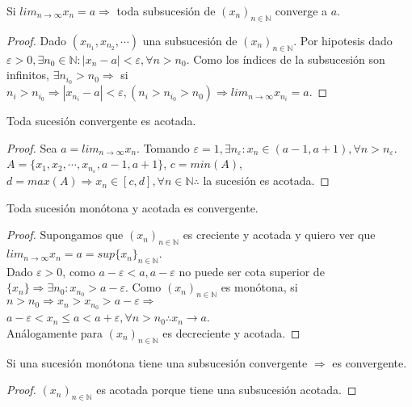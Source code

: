 \begin{theorem}
  Si $lim_{n \to \infty} x_n = a \Rightarrow$ toda subsucesión de $(x_n)_{n \in \mathbb{N}}$ converge a $a$.

  \begin{proof}
    Dado $(x_{n_1}, x_{n_2}, \cdots)$ una subsucesión de $(x_n)_{n \in \mathbb{N}}$. Por hipotesis dado $\varepsilon > 0, \exists n_0 \in \mathbb{N} : |x_n - a| < \varepsilon, \forall n > n_0$. Como los índices de la subsucesión son infinitos, $\exists n_{i_0} > n_0 \Rightarrow$ si $n_i > n_{i_0} \Rightarrow |x_{n_i} - a| < \varepsilon, (n_i > n_{i_0} > n_0) \Rightarrow lim_{n \to \infty} x_{n_i} = a$.
  \end{proof}
\end{theorem}

\begin{theorem}
  Toda sucesión convergente es acotada.
  \begin{proof}
    Sea $a = lim_{n \to \infty} x_n$. Tomando $\varepsilon = 1, \exists n_{\varepsilon} : x_n \in (a - 1, a+1), \forall n > n_{\varepsilon}$. \\
    $A = \{ x_1, x_2, \cdots, x_{n_{\varepsilon}}, a-1, a+1 \}$, $c = min(A)$, $d = max(A) \Rightarrow x_n \in [c, d], \forall n \in \mathbb{N} \therefore $ la sucesión es acotada.
  \end{proof}
\end{theorem}

\begin{theorem}
  Toda sucesión monótona y acotada es convergente.
  \begin{proof}
    Supongamos que $(x_n)_{n \in \mathbb{N}}$ es creciente y acotada y quiero ver que $lim_{n \to \infty} x_n = a = sup\{x_n\}_{n \in \mathbb{N}}$. \\
    Dado $\varepsilon > 0$, como $a-\varepsilon < a, a-\varepsilon$ no puede ser cota superior de $\{x_n\} \Rightarrow \exists n_0 : x_{n_0} > a - \varepsilon$.
    Como $(x_n)_{n \in \mathbb{N}}$ es monótona, si $n > n_0 \Rightarrow x_n > x_{n_0} > a - \varepsilon \Rightarrow$ \\
    $a-\varepsilon < x_n \leq a < a+\varepsilon, \forall n > n_0 \therefore x_n \to a$. \\
    Análogamente para $(x_n)_{n \in \mathbb{N}}$ es decreciente y acotada.
  \end{proof}
\end{theorem}

\begin{corollary}
  Si una sucesión monótona tiene una subsucesión convergente $\Rightarrow$ es convergente.
  \begin{proof}
    $(x_n)_{n \in \mathbb{N}}$ es acotada porque tiene una subsucesión acotada.
  \end{proof}
\end{corollary}


